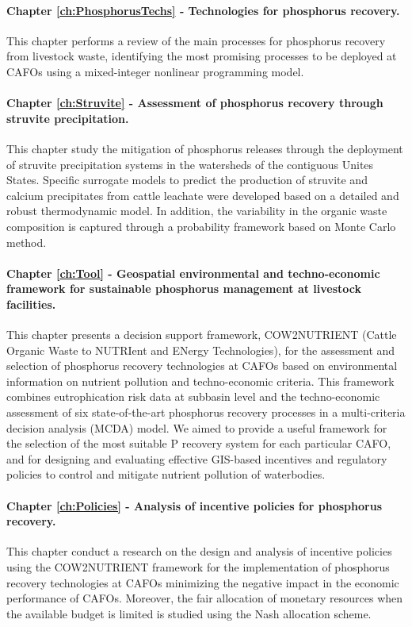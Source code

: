 \begin{refsection}[referencesCh1]
\paragraph{Chapter \ref{ch:PhosphorusTechs} - Technologies for phosphorus recovery.} This chapter performs a review of the main processes for phosphorus recovery from livestock waste, identifying the most promising processes to be deployed at CAFOs using a mixed-integer nonlinear programming model.

\paragraph{Chapter \ref{ch:Struvite} - Assessment of phosphorus recovery through struvite precipitation.} This chapter study the mitigation of phosphorus releases through the deployment of struvite precipitation systems in the watersheds of the contiguous Unites States. Specific surrogate models to predict the production of struvite and calcium precipitates from cattle leachate were developed based on a detailed and robust thermodynamic model. In addition, the variability in the organic waste composition is captured through a probability framework based on Monte Carlo method.

\paragraph{Chapter \ref{ch:Tool} - Geospatial environmental and techno-economic framework for sustainable phosphorus management at livestock facilities.} This chapter presents a decision support framework, COW2NUTRIENT (Cattle Organic Waste to NUTRIent and ENergy Technologies), for the assessment and selection of phosphorus recovery technologies at CAFOs based on environmental information on nutrient pollution and techno-economic criteria. This framework combines eutrophication risk data at subbasin level and the techno-economic assessment of six state-of-the-art phosphorus recovery processes in a multi-criteria decision analysis (MCDA) model. We aimed to provide a useful framework for the selection of the most suitable P recovery system for each particular CAFO, and for designing and evaluating effective GIS-based incentives and regulatory policies to control and mitigate nutrient pollution of waterbodies.

\paragraph{Chapter \ref{ch:Policies} - Analysis of incentive policies for phosphorus recovery.} This chapter conduct a research on the design and analysis of incentive policies using the COW2NUTRIENT framework for the implementation of phosphorus recovery technologies at CAFOs minimizing the negative impact in the economic performance of CAFOs. Moreover, the fair allocation of monetary resources when the available budget is limited is studied using the Nash allocation scheme.


\end{refsection}
